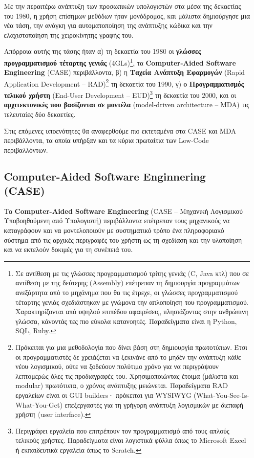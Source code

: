         Με την περαιτέρω ανάπτυξη των προσωπικών υπολογιστών στα μέσα της δεκαετίας του 1980, η χρήση επίσημων μεθόδων ήταν μονόδρομος, και μάλιστα δημιούργησε μια νέα τάση, την ανάγκη για αυτοματοποίηση της ανάπτυξης κώδικα και την ελαχιστοποίηση της χειροκίνητης γραφής του.

        Απόρροια αυτής της τάσης ήταν α) τη δεκαετία του 1980 οι \textbf{γλώσσες προγραμματισμού τέταρτης γενιάς} (4GLs)\footnote{Σε αντίθεση με τις γλώσσες προγραμματισμού τρίτης γενιάς (C, Java κτλ) που σε αντίθεση με της δεύτερης (Assembly) επέτρεπαν τη δημιουργία προγραμμάτων ανεξάρτητα από το μηχάνημα που θα τις έτρεχε, οι γλώσσες προγραμματισμού τέταρτης γενιάς σχεδιάστηκαν με γνώμονα την απλοποίηση του προγραμματισμού. Χαρακτηρίζονται από υψηλού επιπέδου αφαιρέσεις, πλησιάζοντας στην ανθρώπινη γλώσσα, κάνοντάς τες πιο εύκολα κατανοητές. Παραδείγματα είναι η Python, SQL, Ruby.}, τα \textbf{Computer-Aided Software Engineering} (CASE) περιβάλλοντα, β) η \textbf{Ταχεία Ανάπτυξη Εφαρμογών} (Rapid Application Development -- RAD)\footnote{Πρόκειται για μια μεθοδολογία που δίνει βάση στη δημιουργία πρωτοτύπων. Έτσι οι προγραμματιστές δε χρειάζεται να ξεκινάνε από το μηδέν την ανάπτυξη κάθε νέου λογισμικού, ούτε να ξοδεύουν πολύτιμο χρόνο για να περιγράψουν λεπτομερώς όλες τις προδιαγραφές του. Χρησιμοποιώντας έτοιμα (μάλιστα και modular) πρωτότυπα, ο χρόνος ανάπτυξης μειώνεται. Παραδείγματα RAD εργαλείων είναι οι GUI builders· πρόκειται για WYSIWYG (What-You-See-Is-What-You-Get) επεξεργαστές για τη γρήγορη ανάπτυξη λογισμικών με διεπαφή χρήστη (user interface).} τη δεκαετία του 1990, γ) ο \textbf{Προγραμματισμός τελικού χρήστη} (End-User Development -- EUD)\footnote{Περιγράφει εργαλεία που επιτρέπουν τον προγραμματισμό από τους απλούς τελικούς χρήστες. Παραδείγματα είναι λογιστικά φύλλα όπως το Microsoft Excel ή εκπαιδευτικά εργαλεία όπως το Scratch.} τη δεκαετία του 2000, και οι \textbf{αρχιτεκτονικές που βασίζονται σε μοντέλα} (model-driven architecture -- MDA) τις τελευταίες δύο δεκαετίες. \cite{Case1985, CASEChikofsky, MDELow}

        Στις επόμενες υποενότητες θα αναφερθούμε πιο εκτεταμένα στα CASE και MDA περιβάλλοντα, τα οποία υπήρξαν και τα κύρια πρωταίτια των Low-Code περιβαλλόντων.

        \subsection{Computer-Aided Software Enginnering (CASE)}
            Τα \textbf{Computer-Aided Software Engineering} (CASE -- Μηχανική Λογισμικού Υποβοηθούμενη από Υπολογιστή) περιβάλλοντα επέτρεπαν τους μηχανικούς να καταγράφουν και να μοντελοποιούν με συστηματικό τρόπο ένα πληροφοριακό σύστημα από τις αρχικές περιγραφές του χρήστη ως τη σχεδίαση και την υλοποίηση και να εκτελούν δοκιμές για τη συνέπειά του.

